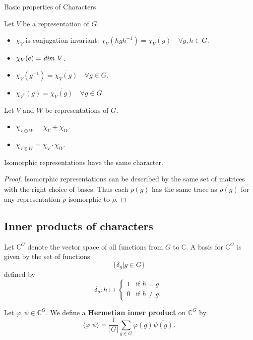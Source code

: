 \begin{frame}{Basic properties of Characters}
\begin{proposition}
Let $V$ be a representation of $G$.
\begin{itemize}
\item $\chi_V$ is conjugation invariant: $\chi_V (h g h^{-1}) = \chi_V (g) \quad \forall g , h \in G$.
\item $\chi_V (e) = \text{\emph{dim }} V$.
\item \label{char-of-inverse} $\chi_V (g^{-1}) = \overline{\chi_V (g)} \quad \forall g \in G$.
\item $\chi_{V^*} (g) =  \overline{\chi_V (g)}\quad \forall g \in G$.
\end{itemize}
\end{proposition}
\begin{proposition}
Let $V$ and $W$ be representations of $G$.
\begin{itemize}
\item $\chi _{V \oplus W} = \chi_V + \chi_W$.
\item $\chi_{V \otimes W} = \chi_V \cdot \chi_W$.
\end{itemize}
\end{proposition}
\end{frame}

\begin{frame}
\begin{proposition}
Isomorphic representations have the same character.
\end{proposition}
\begin{proof}
Isomorphic representations can be described by the same set of matrices with the right choice of bases.  Thus each $\rho(g)$ has the same trace as $\widetilde{\rho(g)}$ for any representation $\widetilde{\rho}$ isomorphic to $\rho$.
\end{proof}
\end{frame}

\subsection{Inner products of characters}
\begin{frame}
\begin{definition}
Let $\mathbb{C}^G$ denote the vector space of all functions from $G$ to $\mathbb{C}$.
A basis for $\mathbb{C}^G$ is given by the set of functions 
\[\{ \delta_g | g \in G  \} \]
defined by 
\[ \delta_g \colon h \mapsto \begin{cases}  1 &\text{if } h = g \\
 0 &\text{if } h \neq g.
\end{cases} \]
\end{definition}
\begin{definition}
Let $\varphi, \psi \in \mathbb{C}^G$.  We define a \textbf{Hermetian inner product}  on $\mathbb{C}^G$ by 
\[ \langle \varphi | \psi \rangle = \frac{1}{|G|} \sum_{g \in G} \varphi(g) \overline{\psi(g)}.\]
\end{definition}
\end{frame}

